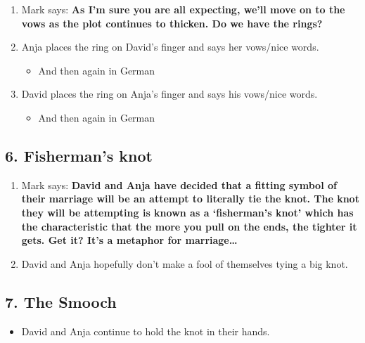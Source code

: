 \begin{enumerate}
\def\labelenumi{\arabic{enumi}.}
\tightlist
\item
  Mark says: \textbf{As I'm sure you are all expecting, we'll move on to
  the vows as the plot continues to thicken. Do we have the rings?}
\item
  Anja places the ring on David's finger and says her vows/nice words.

  \begin{itemize}
  \tightlist
  \item
    And then again in German
  \end{itemize}
\item
  David places the ring on Anja's finger and says his vows/nice words.

  \begin{itemize}
  \tightlist
  \item
    And then again in German
  \end{itemize}
\end{enumerate}

\hypertarget{fishermans-knot}{%
\subsection{6. Fisherman's knot}\label{fishermans-knot}}

\begin{enumerate}
\def\labelenumi{\arabic{enumi}.}
\tightlist
\item
  Mark says: \textbf{David and Anja have decided that a fitting symbol
  of their marriage will be an attempt to literally tie the knot. The
  knot they will be attempting is known as a `fisherman's knot' which
  has the characteristic that the more you pull on the ends, the tighter
  it gets. Get it? It's a metaphor for marriage\ldots{}}
\item
  David and Anja hopefully don't make a fool of themselves tying a big
  knot.
\end{enumerate}

\hypertarget{the-smooch}{%
\subsection{7. The Smooch}\label{the-smooch}}

\begin{itemize}
\tightlist
\item
  David and Anja continue to hold the knot in their hands.
\end{itemize}

